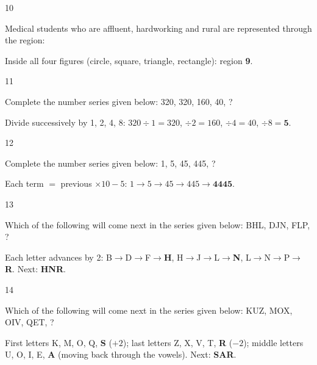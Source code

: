 \begin{question}{10}
{Medical students who are affluent, hardworking and rural are represented through the region:\par}
\begin{explain}
Inside all four figures (circle, square, triangle, rectangle): region \textbf{9}.
\end{explain}
\end{question}

\begin{question}{11}
{Complete the number series given below: 320, 320, 160, 40, ?\par}
\begin{explain}
Divide successively by 1, 2, 4, 8: $320\div1=320$, $\div2=160$, $\div4=40$, $\div8=\mathbf{5}$.
\end{explain}
\end{question}

\begin{question}{12}
{Complete the number series given below: 1, 5, 45, 445, ?\par}
\begin{explain}
Each term $=$ previous $\times10-5$: $1\rightarrow5\rightarrow45\rightarrow445\rightarrow\mathbf{4445}$.
\end{explain}
\end{question}

\begin{question}{13}
{Which of the following will come next in the series given below: BHL, DJN, FLP, ?\par}
\begin{explain}
Each letter advances by 2: B$\rightarrow$D$\rightarrow$F$\rightarrow$\textbf{H}, H$\rightarrow$J$\rightarrow$L$\rightarrow$\textbf{N}, L$\rightarrow$N$\rightarrow$P$\rightarrow$\textbf{R}. Next: \textbf{HNR}.
\end{explain}
\end{question}

\begin{question}{14}
{Which of the following will come next in the series given below: KUZ, MOX, OIV, QET, ?\par}
\begin{explain}
First letters K, M, O, Q, \textbf{S} ($+2$); last letters Z, X, V, T, \textbf{R} ($-2$); middle letters U, O, I, E, \textbf{A} (moving back through the vowels). Next: \textbf{SAR}.
\end{explain}
\end{question}


